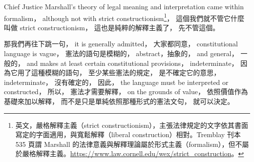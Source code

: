 \hypertarget{w02:cue:2248}{}Chief Justice Marshall's theory of legal meaning and interpretation came within formalism，
\hypertarget{w02:cue:2249}{}although not with strict constructionism\footnote{英文，嚴格解釋主義（strict constructionism），主張法律規定的文字依其書面寫定的字面適用，與寬鬆解釋（liberal construction）相對。Tremblay 刊本 535 頁謂 Marshall 的法律意義與解釋理論屬於形式主義（formalism），但不屬於嚴格解釋主義。\url{https://www.law.cornell.edu/wex/strict_construction}。}，
\hypertarget{w02:cue:2250}{}這個我們就不管它什麼叫做 strict constructionism，
\hypertarget{w02:cue:2251}{}這也是純粹的解釋主義了，
\hypertarget{w02:cue:2252}{}先不管這個。

\hypertarget{w02:cue:2253}{}那我們再往下跳一句，
\hypertarget{w02:cue:2254}{}it is generally admitted，
\hypertarget{w02:cue:2255}{}大家都同意，
\hypertarget{w02:cue:2256}{}constitutional language is vague，
\hypertarget{w02:cue:2257}{}憲法的語句是模糊的，
\hypertarget{w02:cue:2258}{}abstract，抽象的，
\hypertarget{w02:cue:2259}{}and general，
\hypertarget{w02:cue:2260}{}一般的，
\hypertarget{w02:cue:2261}{}and makes at least certain constitutional provisions，
\hypertarget{w02:cue:2262}{}indeterminate，
\hypertarget{w02:cue:2263}{}因為它用了這種模糊的語句，
\hypertarget{w02:cue:2264}{}至少某些憲法的規定，
\hypertarget{w02:cue:2265}{}是不確定它的意思，
\hypertarget{w02:cue:2266}{}indeterminate，
\hypertarget{w02:cue:2267}{}沒有確定的，
\hypertarget{w02:cue:2268}{}因此，
\hypertarget{w02:cue:2269}{}the language must be interpreted or constructed，
\hypertarget{w02:cue:2270}{}所以，
\hypertarget{w02:cue:2271}{}憲法才需要解釋，
\hypertarget{w02:cue:2272}{}on the grounds of value，
\hypertarget{w02:cue:2273}{}依照價值作為基礎來加以解釋，
\hypertarget{w02:cue:2274}{}而不是只是單純依照那種形式的憲法文句，
\hypertarget{w02:cue:2275}{}就可以決定。

